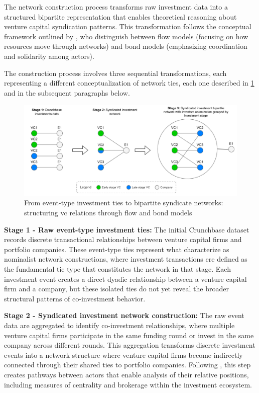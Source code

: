 The network construction process transforms raw investment data into a structured bipartite representation that enables theoretical reasoning about venture capital syndication patterns. This transformation follows the conceptual framework outlined by \cite{Borgatti2011}, who distinguish between flow models (focusing on how resources move through networks) and bond models (emphasizing coordination and solidarity among actors).

The construction process involves three sequential transformations, each representing a different conceptualization of network ties, each one described in \ref{fig:bipartite_pipeline} and in the subsequent paragraphs below.

\begin{figure}[htbp]
    \centering
    \includegraphics[width=\textwidth]{../diagrams/vc_investment_bipartite_pipeline.png}
    \caption{From event-type investment ties to bipartite syndicate networks: structuring vc relations through flow and bond models}
    \label{fig:bipartite_pipeline}
\end{figure}

\textbf{Stage 1 - Raw event-type investment ties:}
The initial Crunchbase dataset records discrete transactional relationships between venture capital firms and portfolio companies. These event-type ties represent what \cite{Borgatti2011} characterize as nominalist network constructions, where investment transactions ere defined as the fundamental tie type that constitutes the network in that stage. Each investment event creates a direct dyadic relationship between a venture capital firm and a company, but these isolated ties do not yet reveal the broader structural patterns of co-investment behavior.

\textbf{Stage 2 - Syndicated investment network construction:}
The raw event data are aggregated to identify co-investment relationships, where multiple venture capital firms participate in the same funding round or invest in the same company across different rounds. This aggregation transforms discrete investment events into a network structure where venture capital firms become indirectly connected through their shared ties to portfolio companies. Following \cite{Borgatti2011}, this step creates pathways between actors that enable analysis of their relative positions, including measures of centrality and brokerage within the investment ecosystem.

